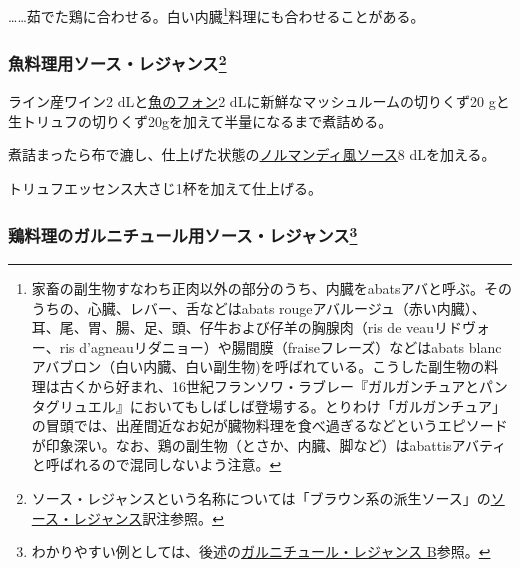 \begin{recette}
\ldots{}\ldots{}茹でた鶏に合わせる。白い内臓\footnote{家畜の副生物すなわち正肉以外の部分のうち、内臓をabatsアバと呼ぶ。そのうちの、心臓、レバー、舌などはabats
  rougeアバルージュ（赤い内臓）、耳、尾、胃、腸、足、頭、仔牛および仔羊の胸腺肉（ris
  de veauリドヴォー、ris
  d'agneauリダニョー）や腸間膜（fraiseフレーズ）などはabats
  blancアバブロン（白い内臓、白い副生物)を呼ばれている。こうした副生物の料理は古くから好まれ、16世紀フランソワ・ラブレー『ガルガンチュアとパンタグリュエル』においてもしばしば登場する。とりわけ「ガルガンチュア」の冒頭では、出産間近なお妃が臓物料理を食べ過ぎるなどというエピソードが印象深い。なお、鶏の副生物（とさか、内臓、脚など）はabattisアバティと呼ばれるので混同しないよう注意。}料理にも合わせることがある。

\hypertarget{sauce-regence-pour-poissons}{%
\subsubsection[魚料理用ソース・レジャンス]{\texorpdfstring{魚料理用ソース・レジャンス\footnote{ソース・レジャンスという名称については「ブラウン系の派生ソース」の\protect\hyperlink{sauce-regence}{ソース・レジャンス}訳注参照。}}{魚料理用ソース・レジャンス}}\label{sauce-regence-pour-poissons}}



ライン産ワイン2 dLと\protect\hyperlink{fumet-de-poisson}{魚のフォン}2
dLに新鮮なマッシュルームの切りくず20
gと生トリュフの切りくず20gを加えて半量になるまで煮詰める。

煮詰まったら布で漉し、仕上げた状態の\protect\hyperlink{sauce-normande}{ノルマンディ風ソース}8
dLを加える。

トリュフエッセンス大さじ1杯を加えて仕上げる。

\hypertarget{sauce-regence-pour-garnitures-de-volaille}{%
\subsubsection[鶏料理のガルニチュール用ソース・レジャンス]{\texorpdfstring{鶏料理のガルニチュール用ソース・レジャンス\footnote{わかりやすい例としては、後述の\protect\hyperlink{garniture-regence}{ガルニチュール・レジャンス
  B}参照。}}{鶏料理のガルニチュール用ソース・レジャンス}}\label{sauce-regence-pour-garnitures-de-volaille}}


\end{recette}
